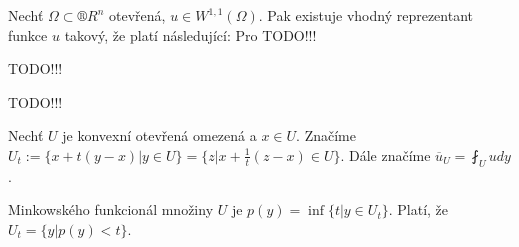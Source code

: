 \documentclass[12pt]{article}					%
\begin{document}
\begin{veta}
	Nechť $Ω \subset ®R^n$ otevřená, $u \in W^{1, 1}(Ω)$. Pak existuje vhodný reprezentant funkce $u$ takový, že platí následující: Pro TODO!!!
\end{veta}

TODO!!!


TODO!!!


\begin{definice}
	Nechť $U$ je konvexní otevřená omezená a $x \in U$. Značíme $U_t := \{x + t(y - x) | y \in U\} = \{z | x + \frac{1}{t}(z - x) \in U\}$. Dále značíme $\overline{u}_U = \fint_{U} u dy$.

	Minkowského funkcionál množiny $U$ je $p(y) = \inf \{t | y \in U_t\}$. Platí, že $U_t = \{y | p(y) < t\}$.
\end{definice}
\end{document}

